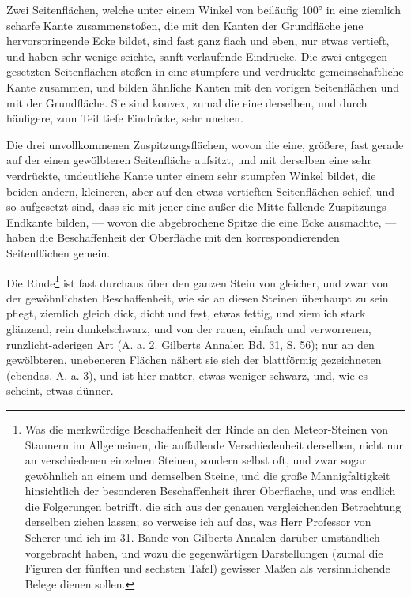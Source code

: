 \documentclass[a4paper, 11pt, oneside, german]{article}
\begin{document}
Zwei Seitenflächen, welche unter einem Winkel von beiläufig 100° in eine ziemlich scharfe Kante zusammenstoßen, die mit den Kanten der Grundfläche jene hervorspringende Ecke bildet, sind fast ganz flach und eben, nur etwas vertieft, und haben sehr wenige seichte, sanft verlaufende Eindrücke. Die zwei entgegen gesetzten Seitenflächen stoßen in eine stumpfere und verdrückte gemeinschaftliche Kante zusammen, und bilden ähnliche Kanten mit den vorigen Seitenflächen und mit der Grundfläche. Sie sind konvex, zumal die eine derselben, und durch häufigere, zum Teil tiefe Eindrücke, sehr uneben.

Die drei unvollkommenen Zuspitzungsflächen, wovon die eine, größere, fast gerade auf der einen gewölbteren Seitenfläche aufsitzt, und mit derselben eine sehr verdrückte, undeutliche Kante unter einem sehr stumpfen Winkel bildet, die beiden andern, kleineren, aber auf den etwas vertieften Seitenflächen schief, und so aufgesetzt sind, dass sie mit jener eine außer die Mitte fallende Zuspitzungs-Endkante bilden, --- wovon die abgebrochene Spitze die eine Ecke ausmachte, --- haben die Beschaffenheit der Oberfläche mit den korrespondierenden Seitenflächen gemein.

Die Rinde\footnote{Was die merkwürdige Beschaffenheit der Rinde an den Meteor-Steinen von Stannern im Allgemeinen, die auffallende Verschiedenheit derselben, nicht nur an verschiedenen einzelnen Steinen, sondern selbst oft, und zwar sogar gewöhnlich an einem und demselben Steine, und die große Mannigfaltigkeit hinsichtlich der besonderen Beschaffenheit ihrer Oberflache, und was endlich die Folgerungen betrifft, die sich aus der genauen vergleichenden Betrachtung derselben ziehen lassen; so verweise ich auf das, was Herr Professor von Scherer und ich im 31. Bande von Gilberts Annalen darüber umständlich vorgebracht haben, und wozu die gegenwärtigen Darstellungen (zumal die Figuren der fünften und sechsten Tafel) gewisser Maßen als versinnlichende Belege dienen sollen.} ist fast durchaus über den ganzen Stein von gleicher, und zwar von der gewöhnlichsten Beschaffenheit, wie sie an diesen Steinen überhaupt zu sein pflegt, ziemlich gleich dick, dicht und fest, etwas fettig, und ziemlich stark glänzend, rein dunkelschwarz, und von der rauen, einfach und verworrenen, runzlicht-aderigen Art (A. a. 2. Gilberts Annalen Bd. 31, S. 56); nur an den gewölbteren, unebeneren Flächen nähert sie sich der blattförmig gezeichneten (ebendas. A. a. 3), und ist hier matter, etwas weniger schwarz, und, wie es scheint, etwas dünner.
\end{document}
